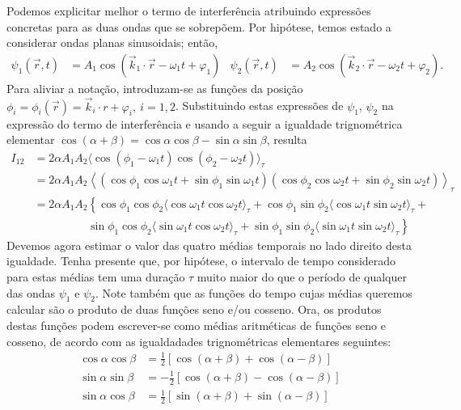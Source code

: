 Podemos explicitar melhor o termo de interferência atribuindo expressões
concretas para as duas ondas que se sobrepõem. Por hipótese, temos estado a
considerar ondas planas sinusoidais; então,
\begin{align*}
\psi_1(\vec r,t)&=A_1\cos\left(\vec k_1\cdot\vec r-\omega_1 t+\varphi_1\right)&
\psi_2(\vec r,t)&=A_2\cos\left(\vec k_2\cdot\vec r-\omega_2 t+\varphi_2\right).
\end{align*}
Para aliviar a notação, introduzam-se as funções da posição $\phi_i=\phi_i(\vec
r)=\vec k_i\cdot r+\varphi_i,\ i=1,2$. Substituindo estas expressões de
$\psi_1$, $\psi_2$ na expressão do termo de interferência e usando a seguir a
igualdade trignométrica elementar
$\cos(\alpha+\beta)=\cos\alpha\cos\beta-\sin\alpha\sin\beta$, resulta
\begin{align}
I_{12}&=2\alpha A_1A_2
  \langle\cos(\phi_1-\omega_1t)\cos(\phi_2-\omega_2t)\rangle_\tau\nonumber\\
  &=2\alpha A_1A_2 \left\langle
    (\cos\phi_1\cos\omega_1t+\sin\phi_1\sin\omega_1t)
    (\cos\phi_2\cos\omega_2t+\sin\phi_2\sin\omega_2t)
  \right\rangle_\tau\nonumber\\
&=2\alpha A_1A_2 \left\{
    \cos\phi_1\cos\phi_2\langle\cos\omega_1t\cos\omega_2t\rangle_\tau+
    \cos\phi_1\sin\phi_2\langle\cos\omega_1t\sin\omega_2t\rangle_\tau+\right.
    \nonumber\\
&\hspace{2cm}\left.
    \sin\phi_1\cos\phi_2\langle\sin\omega_1t\cos\omega_2t\rangle_\tau+
    \sin\phi_1\sin\phi_2\langle\sin\omega_1t\sin\omega_2t\rangle_\tau\right\}
    \label{eq:i12}
\end{align}
Devemos agora estimar o valor das quatro médias temporais no lado direito desta
igualdade. Tenha presente que, por hipótese, o intervalo de tempo considerado
para estas médias tem uma duração $\tau$ muito maior do que o período de
qualquer das ondas $\psi_1$ e $\psi_2$. Note também que as funções do tempo
cujas médias queremos calcular são o produto de duas funções seno e/ou cosseno.
Ora, os produtos destas funções podem escrever-se como médias aritméticas de
funções seno e cosseno, de acordo com as igualdadades trignométricas elementares
seguintes:
\begin{align*}
\cos\alpha\cos\beta&=\frac{1}{2}
    \left[\cos(\alpha+\beta)+\cos(\alpha-\beta)\right]\\
\sin\alpha\sin\beta&=-\frac{1}{2}
    \left[\cos(\alpha+\beta)-\cos(\alpha-\beta)\right]\\
\sin\alpha\cos\beta&=\frac{1}{2}
    \left[\sin(\alpha+\beta)+\sin(\alpha-\beta)\right]
\end{align*}
